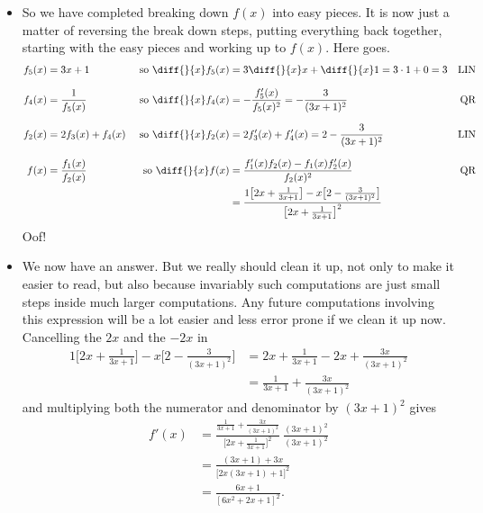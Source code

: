 \begin{eg}
\begin{itemize}
\item So we have completed breaking down $f(x)$ into easy
pieces. It is now just a matter of reversing the break down steps,
putting everything back together, starting with the easy pieces
and working up to $f(x)$. Here goes.
\begin{align*}
f_5(x)&=3x+1 &\text{ so } \diff{}{x} f_5(x) &= 3\diff{}{x} x +\diff{}{x} 1
    =3\cdot 1+0 = 3 & \text{LIN} \\[0.1in]
f_4(x)&=\frac{1}{f_5(x)}
   &\text{ so } \diff{}{x} f_4(x)&=-\frac{f'_5(x)}{f_5(x)^2}=-\frac{3}{(3x+1)^2}
                    & \text{QR} \\[0.1in]
f_2(x)&=2f_3(x)+f_4(x) &\text{ so }
    \diff{}{x} f_2(x) &= 2f'_3(x)+ f'_4(x)=2-\frac{3}{(3x+1)^2}
                    & \text{LIN} \\[0.1in]
f(x)&=\frac{f_1(x)}{f_2(x)}&\text{ so }
     \diff{}{x} f(x)&=\frac{f'_1(x)f_2(x)-f_1(x)f'_2(x)}{f_2(x)^2}
                    & \text{QR} \\
    & &             &=\frac{1\big[2x+\frac{1}{3x+1}\big]
                            -x\big[2-\frac{3}{(3x+1)^2}\big]}
                       {\big[2x+\frac{1}{3x+1}\big]^2}
\end{align*}
Oof!
\item We now have an answer. But we really should clean it up, not only to make
it easier to read, but also because invariably such computations are
just small steps inside much larger computations. Any future computations
involving this expression will be a lot easier and less error prone
if we clean it up now.
Cancelling the $2x$ and the $-2x$ in
\begin{align*}
  1\big[2x+\frac{1}{3x+1}\big]
                            -x\big[2-\frac{3}{(3x+1)^2}\big]
&=2x+\frac{1}{3x+1} -2x+\frac{3x}{(3x+1)^2} \\
&=\frac{1}{3x+1}+\frac{3x}{(3x+1)^2}
\end{align*}
and multiplying both the numerator
and denominator by $(3x+1)^2$ gives
\begin{align*}
f'(x)&=\frac{\frac{1}{3x+1}+\frac{3x}{(3x+1)^2}}
                       {\big[2x+\frac{1}{3x+1}\big]^2}
\ \frac{(3x+1)^2}{(3x+1)^2} \\[0.1in]
&=\frac{(3x+1)+3x}{\big[2x(3x+1)+1\big]^2} \\[0.1in]
&=\frac{6x+1}{[6x^2+2x+1]^2}.
\end{align*}



\end{itemize}

\end{eg}

